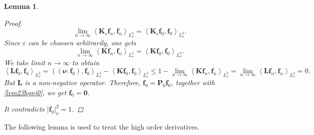 \documentclass[reqno]{amsart}
\numberwithin{equation}{section}
\numberwithin{equation}{section}
\newtheorem{lema}[thm]{Lemma}
\begin{document}
\begin{lema}
\begin{proof}
\begin{equation*}
				\lim_{n \to \infty}\left\langle \mathbf{K}_c\mathbf{f}_n, \mathbf{f}_n  \right\rangle_{L_v^2}=\left\langle \mathbf{K}_c\mathbf{f}_0, \mathbf{f}_0  \right\rangle_{L_v^2}.
			\end{equation*}
			Since $\varepsilon$ can be choosen arbitrarily, one gets 
			\begin{equation*}
				\lim_{n \to \infty}\left\langle \mathbf{K}\mathbf{f}_n, \mathbf{f}_n  \right\rangle_{L_v^2}=\left\langle \mathbf{K}\mathbf{f}_0, \mathbf{f}_0  \right\rangle_{L_v^2}.
			\end{equation*}
			We take limit $n\rightarrow \infty$ to obtain
			\begin{equation*}
				\left\langle \mathbf{L}\mathbf{f}_0, \mathbf{f}_0  \right\rangle_{L_v^2}=\left\langle (\bm{\nu}:\mathbf{f}_0), \mathbf{f}_0  \right\rangle_{L_v^2}-\left\langle \mathbf{K}\mathbf{f}_0, \mathbf{f}_0  \right\rangle_{L_v^2}\leq1-\lim_{n \to \infty}\left\langle \mathbf{K}\mathbf{f}_n, \mathbf{f}_n  \right\rangle_{L_v^2}=\lim_{n \to \infty}\left\langle \mathbf{L}\mathbf{f}_n, \mathbf{f}_n  \right\rangle_{L_v^2}=0. 
			\end{equation*}
			But $\mathbf{L}$ is a non-negative operator.
			Therefore, $\mathbf{f}_0 = \mathbf{P}_0 \mathbf{f}_0$, together with \eqref{lem23hgnj0}, we get $\mathbf{f}_0=\mathbf{0}$. 
			
			It contradicts $|\mathbf{f}_0|^2_{\nu} = 1$. 
		\end{proof}
	\end{lema}
	
	
	
	The following lemma is used to treat the high order derivatives.
	
\end{document}
